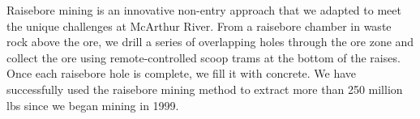 Raisebore mining is an innovative non-entry approach that we adapted to meet the unique challenges at McArthur River. From a raisebore chamber in waste rock above the ore, we drill a series of overlapping holes through the ore zone and collect the ore using remote-controlled scoop trams at the bottom of the raises. Once each raisebore hole is complete, we fill it with concrete. We have successfully used the raisebore mining method to extract more than 250 million lbs since we began mining in 1999.
